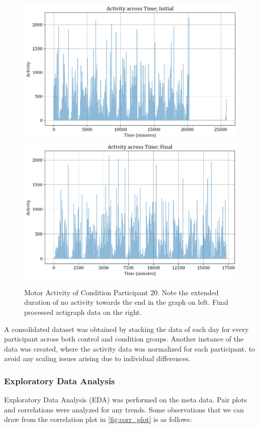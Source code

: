 \documentclass[11pt,a4paper]{article}
\newcommand{\noi}{\noindent}
\begin{document}
\begin{figure}[H]
	\centering
	\includegraphics[scale=0.35]{images/actigraph_init.png}
	\includegraphics[scale=0.35]{images/actigraph_final.png}
	\caption{Motor Activity of Condition Participant 20. Note the extended duration of no activity towards the end in the graph on left. Final processed actigraph data on the right.}
	\label{fig:act_condn1}
\end{figure}

\noi
A consolidated dataset was obtained by stacking the data of each day for every participant across both control and condition groups. Another instance of the data was created, where the activity data was normalized for each participant, to avoid any scaling issues arising due to individual differences. 

\subsubsection{Exploratory Data Analysis}
Exploratory Data Analysis (EDA) was performed on the meta data. Pair plots and correlations were analyzed for any trends. Some observations that we can draw from the correlation plot in \autoref{fig:corr_plot} is as follows:
\end{document}
